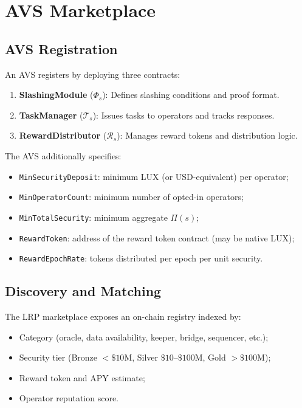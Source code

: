 \section{AVS Marketplace}

\label{sec:marketplace}

\subsection{AVS Registration}

An AVS registers by deploying three contracts:

\begin{enumerate}[leftmargin=1.5em]
  \item \textbf{SlashingModule} ($\Phi_s$): Defines slashing conditions and proof format.
  \item \textbf{TaskManager} ($\mathcal{T}_s$): Issues tasks to operators and tracks responses.
  \item \textbf{RewardDistributor} ($\mathcal{R}_s$): Manages reward tokens and distribution logic.
\end{enumerate}

The AVS additionally specifies:
\begin{itemize}[leftmargin=1.5em]
  \item \texttt{MinSecurityDeposit}: minimum LUX (or USD-equivalent) per operator;
  \item \texttt{MinOperatorCount}: minimum number of opted-in operators;
  \item \texttt{MinTotalSecurity}: minimum aggregate $\Pi(s)$;
  \item \texttt{RewardToken}: address of the reward token contract (may be native LUX);
  \item \texttt{RewardEpochRate}: tokens distributed per epoch per unit security.
\end{itemize}

\subsection{Discovery and Matching}

The LRP marketplace exposes an on-chain registry indexed by:
\begin{itemize}[leftmargin=1.5em]
  \item Category (oracle, data availability, keeper, bridge, sequencer, etc.);
  \item Security tier (Bronze $< \$10$M, Silver $\$10$--$\$100$M, Gold $> \$100$M);
  \item Reward token and APY estimate;
  \item Operator reputation score.
\end{itemize}

